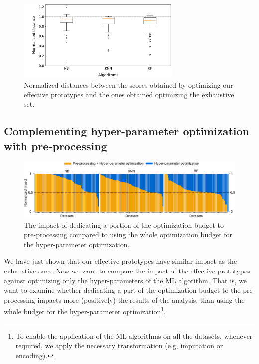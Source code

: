 \begin{figure}[!t]
    \centering
    \includegraphics[width=0.7\textwidth]{chapters/data-centric/supervised/img/evaluation2.pdf}
    \caption{Normalized distances between the scores obtained by optimizing our effective prototypes and the ones obtained optimizing the exhaustive set.}
    \label{fig:eval-exhaustive-vs-effective}
\end{figure}

\subsection{Complementing hyper-parameter optimization with pre-processing}
\label{sec:eval-dpso-vs-cash}

\begin{figure}[!t]
	\centering
	\includegraphics[width=1.0\textwidth]{chapters/data-centric/supervised/img/barplot-10.pdf}
	\caption{The impact of dedicating a portion of the optimization budget to pre-processing compared to using the whole optimization budget for the hyper-parameter optimization.}
	\label{fig:eval-pre-processing-hyper-parameter}
\end{figure}

We have just shown that our effective prototypes have similar impact as the exhaustive ones.
Now we want to compare the impact of the effective prototypes against optimizing only the hyper-parameters of the ML algorithm.
That is, we want to examine whether dedicating a part of the optimization budget to the pre-processing impacts more (positively) the results of the analysis, than using the whole budget for the hyper-parameter optimization\footnote{To enable the application of the ML algorithms on all the datasets, whenever required, we apply the necessary transformation (e.g, imputation or encoding).}.


